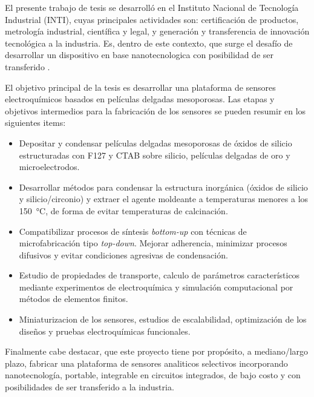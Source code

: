 	El presente trabajo de tesis se desarrolló en el Instituto Nacional de Tecnología Industrial (INTI), cuyas principales actividades son: certificación de productos, metrología industrial, científica y legal, y generación y transferencia	de innovación tecnológica a la industria. Es, dentro de este contexto, que surge el desafío de desarrollar un dispositivo en base nanotecnologica con posibilidad de ser transferido . 

	El objetivo principal de la tesis es desarrollar una plataforma de sensores electroquímicos basados en películas delgadas mesoporosas. Las etapas y objetivos intermedios para la fabricación de los sensores se pueden resumir en los siguientes items:

	\begin{itemize}
		
		\item Depositar y condensar películas delgadas mesoporosas de óxidos de silicio estructuradas con F127 y CTAB sobre silicio, películas delgadas de oro y microelectrodos.  
		
		\item Desarrollar métodos para condensar la estructura inorgánica (óxidos de silicio y silicio/circonio) y extraer el agente moldeante a temperaturas menores a los \SI{150}{\celsius}, de forma de evitar temperaturas de calcinación. 

		\item Compatibilizar procesos de síntesis \textit{bottom-up} con técnicas de microfabricación tipo \textit{top-down}. Mejorar adherencia, minimizar procesos difusivos y evitar condiciones agresivas de condensación.

		\item Estudio de propiedades de transporte, calculo de parámetros característicos mediante experimentos de electroquímica y simulación computacional por métodos de elementos finitos.

		\item Miniaturizacion de los sensores, estudios de escalabilidad, optimización de los diseños y pruebas electroquímicas funcionales.

		\end{itemize}	

	Finalmente cabe destacar, que este proyecto tiene por propósito, a mediano/largo plazo, fabricar una plataforma de sensores analiticos selectivos incorporando nanotecnología, portable, integrable en circuitos integrados, de bajo costo y con posibilidades de ser transferido a la industria.